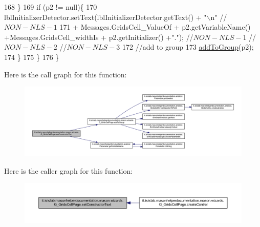 \begin{DoxyCode}
168             \}
169             \textcolor{keywordflow}{if} (p2 != null)\{    
170                 lblInitializerDetector.setText(lblInitializerDetector.getText() + \textcolor{stringliteral}{"\(\backslash\)n"} \textcolor{comment}{//$NON-NLS-1$}
171                     +  Messages.GridsCell\_ValueOf + p2.getVariableName() +Messages.GridsCell\_widthIs + 
      p2.getInitializer() +\textcolor{stringliteral}{"."}); \textcolor{comment}{//$NON-NLS-1$ //$NON-NLS-2$ //$NON-NLS-3$}
172                 \textcolor{comment}{//add to group}
173                 \hyperlink{classit_1_1isislab_1_1masonhelperdocumentation_1_1mason_1_1wizards_1_1_g___grids_cell_page_a43c0ab8367d25f1cfd0cdc9e29f46e5c}{addToGroup}(p2);
174             \}           
175         \}
176     \}
\end{DoxyCode}


Here is the call graph for this function\-:\nopagebreak
\begin{figure}[H]
\begin{center}
\leavevmode
\includegraphics[width=350pt]{classit_1_1isislab_1_1masonhelperdocumentation_1_1mason_1_1wizards_1_1_g___grids_cell_page_a10e043dce0e8661cadbb7a6ea569cb0e_cgraph}
\end{center}
\end{figure}




Here is the caller graph for this function\-:\nopagebreak
\begin{figure}[H]
\begin{center}
\leavevmode
\includegraphics[width=350pt]{classit_1_1isislab_1_1masonhelperdocumentation_1_1mason_1_1wizards_1_1_g___grids_cell_page_a10e043dce0e8661cadbb7a6ea569cb0e_icgraph}
\end{center}
\end{figure}




